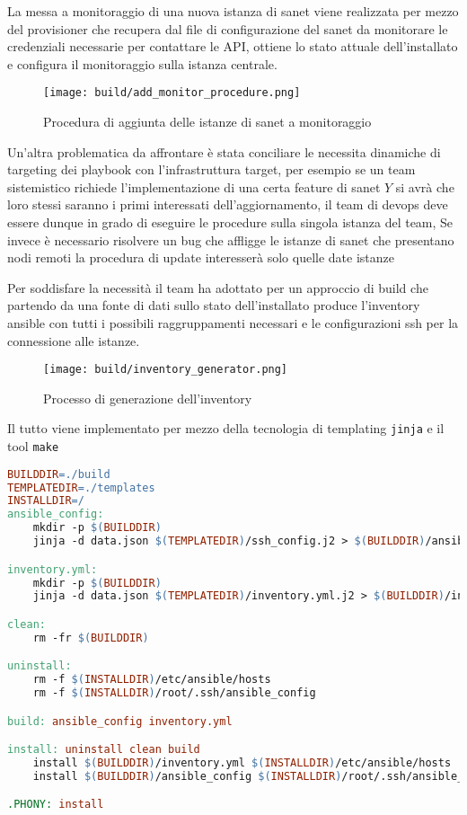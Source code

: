 La messa a monitoraggio di una nuova istanza di sanet viene realizzata per mezzo del provisioner che recupera dal file di configurazione del sanet da monitorare le credenziali necessarie per contattare le API, ottiene lo stato attuale dell'installato e configura il monitoraggio sulla istanza centrale.

\begin{figure}[H]
    \centering
    \texttt{[image: build/add\_monitor\_procedure.png]}
    \caption{Procedura di aggiunta delle istanze di sanet a monitoraggio}
    \label{fig:add_monitor_procedure}
\end{figure}

Un'altra problematica da affrontare è stata conciliare le necessita dinamiche di targeting dei playbook con l'infrastruttura target, per esempio se un team sistemistico richiede l'implementazione di una certa feature di sanet \(Y\) si avrà che loro stessi saranno i primi interessati dell'aggiornamento, il team di devops deve essere dunque in grado di eseguire le procedure sulla singola istanza del team, Se invece è necessario risolvere un bug che affligge le istanze di sanet che presentano nodi remoti la procedura di update interesserà solo quelle date istanze

Per soddisfare la necessità il team ha adottato per un approccio di build che partendo da una fonte di dati sullo stato dell'installato produce l'inventory ansible con tutti i possibili raggruppamenti necessari e le configurazioni ssh per la connessione alle istanze.

\begin{figure}[H]
    \centering
    \texttt{[image: build/inventory\_generator.png]}
    \caption{Processo di generazione dell'inventory}
    \label{fig:inventory_generator}
\end{figure}

Il tutto viene implementato per mezzo della tecnologia di templating \verb|jinja| e il tool \verb|make|

\begin{lstlisting}[language=make]
BUILDDIR=./build
TEMPLATEDIR=./templates
INSTALLDIR=/
ansible_config:
	mkdir -p $(BUILDDIR)
	jinja -d data.json $(TEMPLATEDIR)/ssh_config.j2 > $(BUILDDIR)/ansible_config

inventory.yml:
	mkdir -p $(BUILDDIR)
	jinja -d data.json $(TEMPLATEDIR)/inventory.yml.j2 > $(BUILDDIR)/inventory.yml

clean:
	rm -fr $(BUILDDIR)

uninstall:
	rm -f $(INSTALLDIR)/etc/ansible/hosts
	rm -f $(INSTALLDIR)/root/.ssh/ansible_config

build: ansible_config inventory.yml

install: uninstall clean build
	install $(BUILDDIR)/inventory.yml $(INSTALLDIR)/etc/ansible/hosts
	install $(BUILDDIR)/ansible_config $(INSTALLDIR)/root/.ssh/ansible_config

.PHONY: install
\end{lstlisting}

